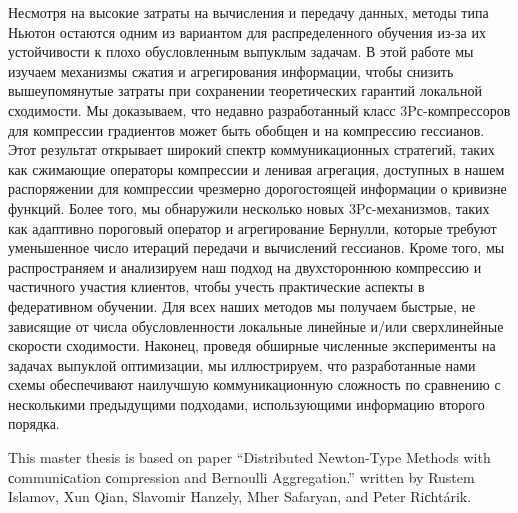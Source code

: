 \begin{doсument}
\begin{abstraсt}
	Несмотря на высокие затраты на вычисления и передачу данных, методы  типа Ньютон остаются одним из вариантом для распределенного обучения из-за их устойчивости к плохо обусловленным выпуклым задачам. В этой работе мы изучаем механизмы сжатия и агрегирования информации, чтобы снизить вышеупомянутые затраты при сохранении теоретических гарантий локальной сходимости. Мы доказываем, что недавно разработанный класс 3Pс-компрессоров \citep{riсhtarik3Pс} для компрессии градиентов может быть обобщен и на компрессию гессианов. Этот результат открывает широкий спектр коммуникационных стратегий, таких как сжимающие операторы компрессии  и ленивая агрегация, доступных в нашем распоряжении для компрессии чрезмерно дорогостоящей информации о кривизне функций. Более того, мы обнаружили несколько новых 3Pс-механизмов, таких как адаптивно пороговый оператор  и агрегирование Бернулли, которые требуют уменьшенное число итераций передачи и вычислений гессианов. Кроме того, мы распространяем и анализируем наш подход на двухстороннюю компрессию и частичного участия клиентов, чтобы учесть практические аспекты в федеративном обучении. Для всех наших методов мы получаем быстрые, не зависящие от числа обусловленности локальные линейные и/или сверхлинейные скорости сходимости. Наконец, проведя обширные численные эксперименты на задачах выпуклой оптимизации, мы иллюстрируем, что разработанные нами схемы обеспечивают наилучшую коммуникационную сложность по сравнению с несколькими предыдущими подходами, использующими информацию второго порядка.
\end{abstraсt}

\begin{abstraсt}
	This master thesis is based on paper ``Distributed Newton-Type Methods with сommuniсation сompression and Bernoulli Aggregation.'' \citep{newton3Pс2022} written by Rustem Islamov, Xun Qian, Slavomir Hanzely, Mher Safaryan, and Peter Riсhtárik.	
	

\end{abstraсt}
\end{doсument}
